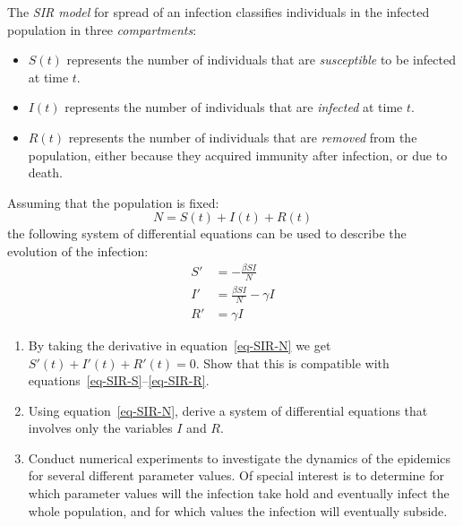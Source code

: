 \begin{exercise}
The \emph{SIR model} for spread of an infection classifies individuals in the infected population in three \emph{compartments}:
\begin{itemize}
\item $S(t)$ represents the number of individuals that are \emph{susceptible} to be infected at time $t$.
\item $I(t)$ represents the number of individuals that are \emph{infected} at time $t$.
\item $R(t)$ represents the number of individuals that are \emph{removed} from the population, either because they acquired immunity after infection, or due to death.
\end{itemize}
Assuming that the population is fixed:
\begin{equation}
\label{eq-SIR-N}
N=S(t)+I(t)+R(t)
\end{equation}
the following system of differential equations can be used to describe the evolution of the infection:
\begin{align}
\label{eq-SIR-S}
S' &= -\frac{\beta SI}{N}\\
\label{eq-SIR-I}
I' &= \frac{\beta SI}{N}-\gamma I\\
\label{eq-SIR-R}
R' &= \gamma I
\end{align}
\begin{enumerate}
\item By taking the derivative in equation~\ref{eq-SIR-N} we get $S'(t)+I'(t)+R'(t)=0$. Show that this is compatible with equations~\ref{eq-SIR-S}--\ref{eq-SIR-R}.
\item Using equation~\ref{eq-SIR-N}, derive a system of differential equations that involves only the variables $I$ and $R$.
\item Conduct numerical experiments to investigate the dynamics of the epidemics for several different parameter values. Of special interest is to determine for which parameter values will the infection take hold and eventually infect the whole population, and for which values the infection will eventually subside.
\end{enumerate}
\end{exercise}
































